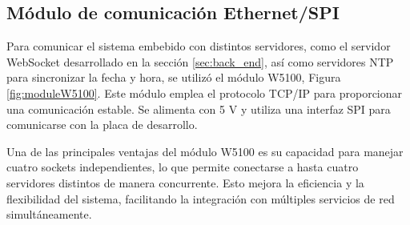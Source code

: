 \subsection{Módulo de comunicación Ethernet/SPI  }\label{sec:moduloEthernet}

Para comunicar el sistema embebido con distintos servidores, como el servidor WebSocket desarrollado en la sección \ref{sec:back_end}, así como servidores NTP para sincronizar la fecha y hora, se utilizó el módulo W5100, Figura \ref{fig:moduleW5100}. Este módulo emplea el protocolo TCP/IP para proporcionar una comunicación estable. Se alimenta con 5 \unit{\volt} y utiliza una interfaz SPI para comunicarse con la placa de desarrollo.

Una de las principales ventajas del módulo W5100 \cite{W5100Datasheet} es su capacidad para manejar cuatro sockets independientes, lo que permite conectarse a hasta cuatro servidores distintos de manera concurrente. Esto mejora la eficiencia y la flexibilidad del sistema, facilitando la integración con múltiples servicios de red simultáneamente.



